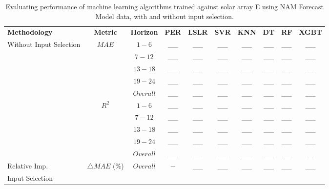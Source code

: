 \begin{table}[h]
\begin{center}
    \caption{Evaluating performance of machine learning algorithms trained against solar array E using NAM Forecast Model data, with and without input selection.}
    \vspace{0.2cm}
    \begin{tabular}{@{}p{5.3em}ccccccccc@{}}
    \toprule
    \textbf{Methodology} & \textbf{Metric} & \textbf{Horizon} & \textbf{PER} & \textbf{LSLR} & \textbf{SVR} & \textbf{KNN} & \textbf{DT} & \textbf{RF} & \textbf{XGBT} \\ \cmidrule(l){1-10} 
    \multirow{10}{5em}{Without Input Selection} & \multirow{5}{*}{$MAE$} & $1 - 6$ & \_\_ & \_\_ & \_\_ & \_\_ & \_\_ & \_\_ & \_\_ \\
                                              &                   & $7 - 12$ & \_\_ & \_\_ & \_\_ & \_\_ & \_\_ & \_\_ & \_\_ \\
                                              &                   & $13 - 18$ & \_\_ & \_\_ & \_\_ & \_\_ & \_\_ & \_\_ & \_\_ \\
                                              &                   & $19 - 24$ & \_\_ & \_\_ & \_\_ & \_\_ & \_\_ & \_\_ & \_\_ \\
                                              &                   & $Overall$ & \_\_ & \_\_ & \_\_ & \_\_ & \_\_ & \_\_ & \_\_ \\ \cmidrule(lr){2-10}
                                              & \multirow{5}{*}{$R^2$} & $1 - 6$ & \_\_ & \_\_ & \_\_ & \_\_ & \_\_ & \_\_ & \_\_ \\
                                              &                   & $7 - 12$ & \_\_ & \_\_ & \_\_ & \_\_ & \_\_ & \_\_ & \_\_ \\
                                              &                   & $13 - 18$ & \_\_ & \_\_ & \_\_ & \_\_ & \_\_ & \_\_ & \_\_ \\
                                              &                   & $19 - 24$ & \_\_ & \_\_ & \_\_ & \_\_ & \_\_ & \_\_ & \_\_ \\
                                              &                   & $Overall$ & \_\_ & \_\_ & \_\_ & \_\_ & \_\_ & \_\_ & \_\_ \\ 
    \midrule
    Relative Imp. & $\bigtriangleup MAE$ (\%)  & $Overall$ & $-$ & \_\_ & \_\_ & \_\_ & \_\_ & \_\_ & \_\_ \\ 
    \midrule
    \multirow{10}{5em}{Input Selection}

\end{tabular}
\end{center}
\end{table}
